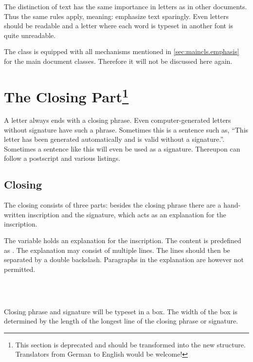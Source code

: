 The distinction of text has the same importance in letters as in other
documents. Thus the same rules apply, meaning: emphasize text
sparingly. Even letters should be readable and a letter where each
word is typeset in another font is quite unreadable.

The class  is equipped with all
mechanisms mentioned in \autoref{sec:maincls.emphasis} for
the main document classes. Therefore it will not be discussed
here again.

\section{The Closing Part\protect\footnote{This section is
  deprecated and should be transformed into the new structure. Translators
  from German to English would be welcome!}}
\label{sec:scrlttr2.backend}

A letter always ends with a closing phrase.  Even computer-generated
letters without signature have such a phrase.  Sometimes this is a
sentence such as, ``This letter has been generated automatically and
is valid without a signature.''.  Sometimes a sentence like this will
even be used as a signature.  Thereupon can follow a postscript and
various listings.

\subsection{Closing}
\label{sec:scrlttr2.closing}

The closing consists of three parts: besides the closing phrase there
are a hand-written inscription and the signature, which acts as an
explanation for the inscription.

\begin{Declaration}
\end{Declaration}
%
The variable  holds an explanation for the
inscription. The content is predefined as
.  The explanation may consist
of multiple lines. The lines should then be separated by a double
backslash. Paragraphs in the explanation are however not permitted.
%
%

\begin{Declaration}
  \\
  \\
\end{Declaration}
%
%
%
Closing phrase and signature will be typeset in a box. The width of
the box is determined by the length of the longest line of the closing
phrase or signature.

